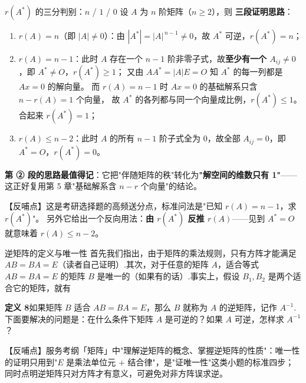\begin{fdeep}{$r(A^{*})$ 的三分判别：$n$ / $1$ / $0$}
设 $A$ 为 $n$ 阶矩阵（$n\ge2$），则
\textbf{三段证明思路}：
\begin{enumerate}[leftmargin=2.2em,itemsep=0.25em]
\item $r(A)=n$（即 $|A|\ne0$）：由 $|A^{*}|=|A|^{\,n-1}\ne0$，故 $A^{*}$ 可逆，$r(A^{*})=n$；
\item $r(A)=n-1$：此时 $A$ 存在一个 $n-1$ 阶非零子式，故\textbf{至少有一个 $A_{ij}\ne0$}，即 $A^{*}\ne O$，$r(A^{*})\ge1$；
      又由 $AA^{*}=|A|E=O$ 知 $A^{*}$ 的每一列都是 $Ax=0$ 的解向量。
      而 $r(A)=n-1$ 时 $Ax=0$ 的基础解系只含 $n-r(A)=1$ 个向量，
      故 $A^{*}$ 的各列都与同一个向量成比例，$r(A^{*})\le1$。合起来 $r(A^{*})=1$；
\item $r(A)\le n-2$：此时 $A$ 的所有 $n-1$ 阶子式全为 $0$，故全部 $A_{ij}=0$，即 $A^{*}=O$，$r(A^{*})=0$。
\end{enumerate}
\textbf{第 ② 段的思路最值得记}：它把"伴随矩阵的秩"转化为\textbf{"解空间的维数只有 1"}\allowbreak——
这正好复用第 5 章"基础解系含 $n-r$ 个向量"的结论。

【反哺点】这是考研选择题的高频送分点，标准问法是"已知 $r(A)=n-1$，求 $r(A^{*})$"。
另外它给出一个反向用法：\textbf{由 $r(A^{*})$ 反推 $r(A)$}——见到 $A^{*}=O$ 就意味着 $r(A)\le n-2$。
\end{fdeep}

\begin{fdeep}{逆矩阵的定义与唯一性}
首先我们指出，由于矩阵的乘法规则，只有方阵才能满足 $AB=BA=E$（读者自己证明）.其次，对于任意的矩阵 $A$，适合等式 $AB=BA=E$ 的矩阵 $B$ 是唯一的（如果有的话）.事实上，假设 $B_1,B_2$ 是两个适合它的矩阵，就有

\textbf{定义 8}\quad 如果矩阵 $B$ 适合 $AB=BA=E$，那么 $B$ 就称为 $A$ 的逆矩阵，记作 $A^{-1}$.下面要解决的问题是：在什么条件下矩阵 $A$ 是可逆的？如果 $A$ 可逆，怎样求 $A^{-1}$？

【反哺点】服务考纲「矩阵」中"理解逆矩阵的概念、掌握逆矩阵的性质"：唯一性的证明只用到"$E$ 是乘法单位元 $+$ 结合律"，是"证唯一性"这类小题的标准四步；同时点明逆矩阵只对方阵才有意义，可避免对非方阵误求逆。
\end{fdeep}

